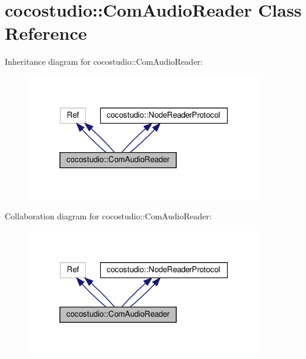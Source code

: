 \hypertarget{classcocostudio_1_1ComAudioReader}{}\section{cocostudio\+:\+:Com\+Audio\+Reader Class Reference}
\label{classcocostudio_1_1ComAudioReader}


Inheritance diagram for cocostudio\+:\+:Com\+Audio\+Reader\+:
\nopagebreak
\begin{figure}[H]
\begin{center}
\leavevmode
\includegraphics[width=292pt]{classcocostudio_1_1ComAudioReader__inherit__graph}
\end{center}
\end{figure}


Collaboration diagram for cocostudio\+:\+:Com\+Audio\+Reader\+:
\nopagebreak
\begin{figure}[H]
\begin{center}
\leavevmode
\includegraphics[width=292pt]{classcocostudio_1_1ComAudioReader__coll__graph}
\end{center}
\end{figure}
